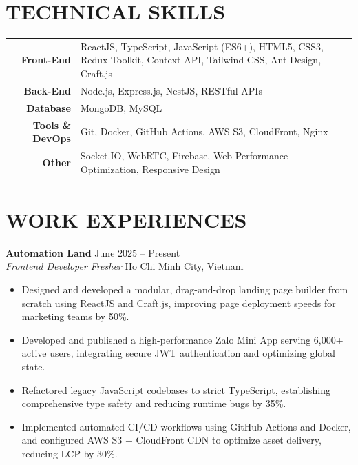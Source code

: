 \documentclass[10pt,a4paper]{article}
\begin{document}
\section*{TECHNICAL SKILLS}
\begin{tabularx}{\textwidth}{r|X}
    \textbf{Front-End} & ReactJS, TypeScript, JavaScript (ES6+), HTML5, CSS3, Redux Toolkit, Context API, Tailwind CSS, Ant Design, Craft.js \\
    \textbf{Back-End} & Node.js, Express.js, NestJS, RESTful APIs \\
    \textbf{Database} & MongoDB, MySQL \\
    \textbf{Tools \& DevOps} & Git, Docker, GitHub Actions, AWS S3, CloudFront, Nginx \\
    \textbf{Other} & Socket.IO, WebRTC, Firebase, Web Performance Optimization, Responsive Design \\
\end{tabularx}

\vspace{1pt}

\section*{WORK EXPERIENCES}
\textbf{Automation Land} \hfill June 2025 -- Present \\
\textit{Frontend Developer Fresher} \hfill Ho Chi Minh City, Vietnam
\begin{itemize}
    \item Designed and developed a modular, drag-and-drop landing page builder from scratch using ReactJS and Craft.js, improving page deployment speeds for marketing teams by 50\%.
    \item Developed and published a high-performance Zalo Mini App serving 6,000+ active users, integrating secure JWT authentication and optimizing global state.
    \item Refactored legacy JavaScript codebases to strict TypeScript, establishing comprehensive type safety and reducing runtime bugs by 35\%.
    \item Implemented automated CI/CD workflows using GitHub Actions and Docker, and configured AWS S3 + CloudFront CDN to optimize asset delivery, reducing LCP by 30\%.
\end{itemize}
\end{document}
